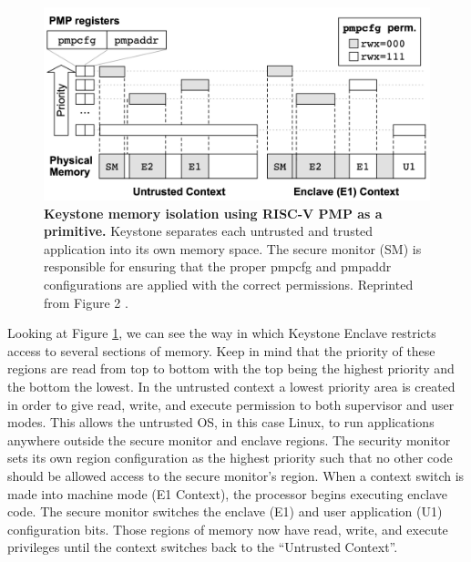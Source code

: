 \begin{figure}[ht]
\includegraphics[width=\textwidth]{img/keystone-pmp-tmp.png}
\caption[Keystone PMP Protection]{\textbf{Keystone memory isolation using RISC-V PMP as a primitive.} Keystone separates each untrusted and trusted application into its own memory space. The secure monitor (SM) is responsible for ensuring that the proper pmpcfg and pmpaddr configurations are applied with the correct permissions. Reprinted from Figure 2 \cite{lee2019keystone}.
\label{figure:keystone-pmp}}
\end{figure}

Looking at Figure \ref{figure:keystone-pmp}, we can see the way in which Keystone Enclave restricts access to several sections of memory. Keep in mind that the priority of these regions are read from top to bottom with the top being the highest priority and the bottom the lowest. In the untrusted context a lowest priority area is created in order to give read, write, and execute permission to both supervisor and user modes. This allows the untrusted OS, in this case Linux, to run applications anywhere outside the secure monitor and enclave regions. The security monitor sets its own region configuration as the highest priority such that no other code should be allowed access to the secure monitor's region. When a context switch is made into machine mode (E1 Context), the processor begins executing enclave code. The secure monitor switches the enclave (E1) and user application (U1) configuration bits. Those regions of memory now have read, write, and execute privileges until the context switches back to the ``Untrusted Context''. 

